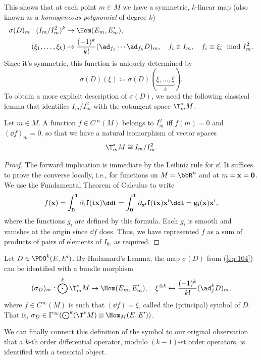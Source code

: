 This shows that at each point $m\in M$ we have a symmetric, $k$-linear map (also known as a \emph{homogeneous polynomial} of degree $k$)
\begin{align}
    \sigma(D)_m:(I_m\slash I_m^2)^k &\to \Hom(E_m,E_m'),\\
    (\xi_1,\ldots,\xi_k)&\mapsto \frac{(-1)^k}{k!}(\ad_{f_1}\cdots \ad_{f_k}D)_m,\quad f_i\in I_m,\quad f_i\equiv \xi_i\mod I^2_m. \label{eq 104}
\end{align}
Since it's symmetric, this function is uniquely determined by 
\[\sigma(D)(\xi)\coloneqq \sigma(D)(\underbrace{\xi,\ldots,\xi}_k).\]
To obtain a more explicit description of $\sigma(D)$, we need the following classical lemma that identifies $I_m\slash I^2_m$ with the cotangent space $\T^\ast_m M$.

\begin{lem}[Hadamard]
    Let $m\in M$. A function $f\in C^\infty(M)$ belongs to $I^2_m$ iff $f(m)=0$ and $(\dd f)_m=0$, so that we have a natural isomorphism of vector spaces 
    \[\T^\ast_m M\cong I_m\slash I^2_m.\]
\end{lem}
\begin{proof}
    The forward implication is immediate by the Leibniz rule for $\dd$. It suffices to prove the converse locally, i.e., for functions on $M=\bbR^n$ and at $m=\bf{x}=0$. We use the Fundamental Theorem of Calculus to write 
    \[f(\bf{x})=\int_0^1 \partial_t f(t\bf{x})\dd t=\int_0^1 \partial_{x^i}f(t\bf{x})x^i\dd t=g_i(\bf{x})x^i,\]
    where the functions $g_i$ are defined by this formula. Each $g_i$ is smooth and vanishes at the origin since $\dd f$ does. Thus, we have represented $f$ as a sum of products of pairs of elements of $I_0$, as required. 
\end{proof}

\begin{defn}[Symbol]
    Let $D\in\PDO^k(E,E')$. By Hadamard's Lemma, the map $\sigma(D)$ from (\ref{eq 104}) can be identified with a bundle morphism
    \[(\sigma_D)_m:\bigodot^k \T^\ast_mM\to \Hom(E_m,E_m'),\quad \xi^{\otimes k}\mapsto \frac{(-1)^k}{k!}(\ad_f^k D)_m, \]
    where $f\in C^\infty(M)$ is such that $(\dd f)=\xi$, called the (principal) symbol of $D$. That is, $\sigma_D\in \Gamma^\infty(\bigodot^k(\T^\ast M)\otimes \Hom_M(E,E'))$.
\end{defn}

We can finally connect this definition of the symbol to our original observation that a $k$-th order differential operator, modulo $(k-1)$-st order operators, is identified with a tensorial object.

